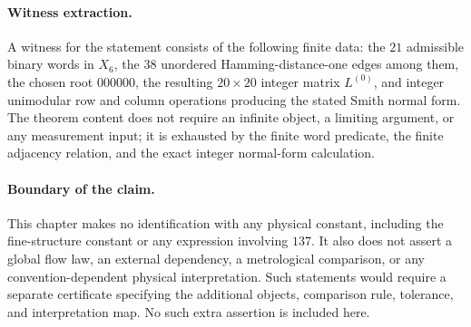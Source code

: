 \paragraph{Witness extraction.}
A witness for the statement consists of the following finite data: the $21$ admissible binary words in $X_6$, the $38$ unordered Hamming-distance-one edges among them, the chosen root $000000$, the resulting $20\times 20$ integer matrix $L^{(0)}$, and integer unimodular row and column operations producing the stated Smith normal form. The theorem content does not require an infinite object, a limiting argument, or any measurement input; it is exhausted by the finite word predicate, the finite adjacency relation, and the exact integer normal-form calculation.

\paragraph{Boundary of the claim.}
This chapter makes no identification with any physical constant, including the fine-structure constant or any expression involving $137$. It also does not assert a global flow law, an external dependency, a metrological comparison, or any convention-dependent physical interpretation. Such statements would require a separate certificate specifying the additional objects, comparison rule, tolerance, and interpretation map. No such extra assertion is included here.
